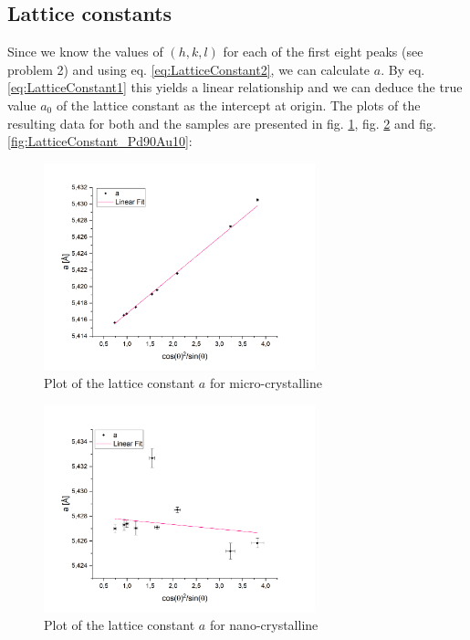 \documentclass[12pt]{article}
\begin{document}
\subsection{Lattice constants}

Since we know the values of $(h,k,l)$ for each of the first eight peaks (see problem 2) and using eq. \ref{eq:LatticeConstant2}, we can calculate $a$. By eq. \ref{eq:LatticeConstant1} this yields a linear relationship and we can deduce the true value $a_0$ of the lattice constant as the intercept at origin. The plots of the resulting data for both  and the  samples are presented in fig. \ref{fig:LatticeConstant_CeO2_1}, fig. \ref{fig:LatticeConstant_CeO2_2} and fig. \ref{fig:LatticeConstant_Pd90Au10}:

\begin{figure}[!ht]
    \centering
    \includegraphics[width=0.7\textwidth]{2_XRD/Graphics/Experiments/Lattice Constants/LatticeConstant_CeO2_1.png}
    \caption{Plot of the lattice constant $a$ for micro-crystalline }
    \label{fig:LatticeConstant_CeO2_1}
\end{figure}
\FloatBarrier

\begin{figure}[!ht]
    \centering
    \includegraphics[width=0.7\textwidth]{2_XRD/Graphics/Experiments/Lattice Constants/LatticeConstant_CeO2_2.png}
    \caption{Plot of the lattice constant $a$ for nano-crystalline }
    \label{fig:LatticeConstant_CeO2_2}
\end{figure}
\FloatBarrier
\end{document}
